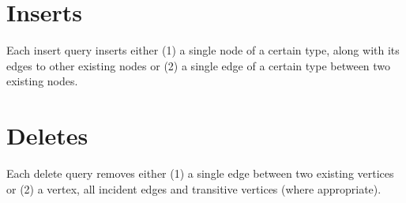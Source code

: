 


\section{Inserts}
\label{sec:inserts}

Each insert query inserts either (1) a single node of a certain type, along with its edges to other existing nodes or (2) a single edge of a certain type between two existing nodes.



\section{Deletes}
\label{sec:deletes}

Each delete query removes either (1) a single edge between two existing vertices or (2) a vertex, all incident edges and transitive vertices (where appropriate).



